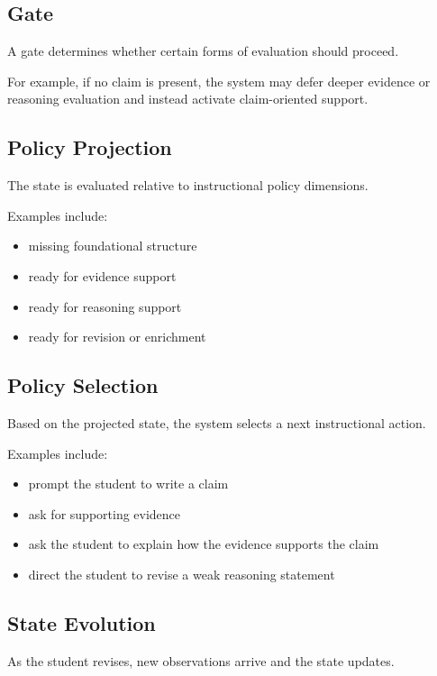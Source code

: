 \documentclass[11pt]{article}
\begin{document}
\subsection*{Gate}

A gate determines whether certain forms of evaluation should proceed.

For example, if no claim is present, the system may defer deeper evidence or reasoning evaluation and instead activate claim-oriented support.

\subsection*{Policy Projection}

The state is evaluated relative to instructional policy dimensions.

Examples include:

\begin{itemize}
\item missing foundational structure
\item ready for evidence support
\item ready for reasoning support
\item ready for revision or enrichment
\end{itemize}

\subsection*{Policy Selection}

Based on the projected state, the system selects a next instructional action.

Examples include:

\begin{itemize}
\item prompt the student to write a claim
\item ask for supporting evidence
\item ask the student to explain how the evidence supports the claim
\item direct the student to revise a weak reasoning statement
\end{itemize}

\subsection*{State Evolution}

As the student revises, new observations arrive and the state updates.
\end{document}
